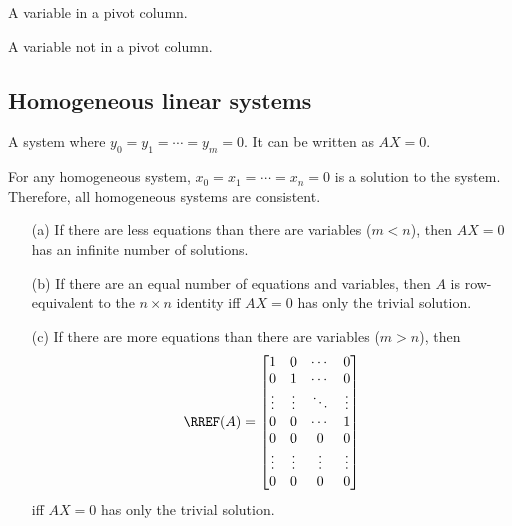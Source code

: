 \begin{definition}
  A variable in a pivot column.
\end{definition}

\begin{definition}
  A variable not in a pivot column.
\end{definition}

\subsection{Homogeneous linear systems}

\begin{definition} A system where $y_0 = y_1 = \cdots = y_m = 0$. It can be written as $AX = 0$.
\end{definition}

\begin{theorem} For any homogeneous system, $x_0 = x_1 = \cdots = x_n = 0$ is a solution to the system. Therefore, all homogeneous systems are consistent.
\end{theorem}

\begin{theorem}
  \begin{enumerate}
    \item[(a)] If there are less equations than there are variables ($m < n$), then $AX = 0$ has an infinite number of solutions.
    \item[(b)] If there are an equal number of equations and variables, then $A$ is row-equivalent to the $n \times n$ identity iff $AX = 0$ has only the trivial solution.
    \item[(c)] If there are more equations than there are variables ($m > n$), then 
    \[
      \RREF(A) = \begin{bmatrix}
        1 & 0 & \cdots & 0 \\
        0 & 1 & \cdots & 0 \\
        \vdots & \vdots & \ddots & \vdots \\
        0 & 0 & \cdots & 1 \\
        0 & 0 & 0 & 0 \\
        \vdots & \vdots & \vdots & \vdots \\
        0 & 0 & 0 & 0 \\
      \end{bmatrix}
    \] iff $AX = 0$ has only the trivial solution.
  \end{enumerate}
\end{theorem}

